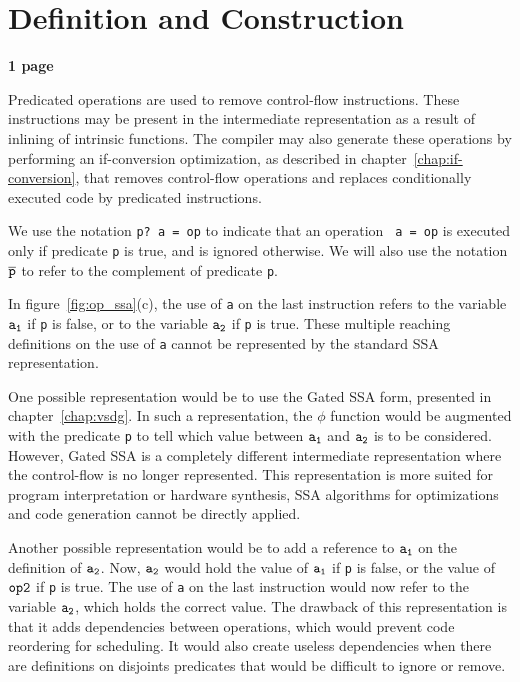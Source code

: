 \section{Definition and Construction}

\textbf{1 page}


Predicated operations are used to remove control-flow instructions.
These instructions may be present in the intermediate representation
as a result of inlining of intrinsic functions. The compiler may also
generate these operations by performing an if-conversion optimization,
as described in chapter~\ref{chap:if-conversion}, that removes
control-flow operations and replaces conditionally executed code by
predicated instructions.

We use the notation {\tt p? a = op} to indicate that an operation {\tt
  a = op} is executed only if predicate {\tt p} is true, and is
ignored otherwise. We will also use the notation ${\tt \overline{p}}$
to refer to the complement of predicate {\tt p}.

In figure~\ref{fig:op_ssa}(c), the use of {\tt a} on the last
instruction refers to the variable ${\tt a_1}$ if {\tt p} is false, or
to the variable ${\tt a_2}$ if {\tt p} is true. These multiple
reaching definitions on the use of {\tt a} cannot be represented by
the standard SSA representation.

One possible representation would be to use the Gated SSA form,
presented in chapter~\ref{chap:vsdg}. In such a representation, the
$\phi$ function would be augmented with the predicate {\tt p} to tell
which value between ${\tt a_1}$ and ${\tt a_2}$ is to be
considered. However, Gated SSA is a completely different intermediate
representation where the control-flow is no longer represented. This
representation is more suited for program interpretation or hardware
synthesis, SSA algorithms for optimizations and code generation cannot
be directly applied.

Another possible representation would be to add a reference to ${\tt
  a_1}$ on the definition of ${\tt a_2}$. Now, ${\tt a_2}$ would hold
the value of ${\tt a_1}$ if {\tt p} is false, or the value of ${\tt
  op2}$ if {\tt p} is true. The use of {\tt a} on the last instruction
would now refer to the variable ${\tt a_2}$, which holds the correct
value. The drawback of this representation is that it adds
dependencies between operations, which would prevent code reordering
for scheduling. It would also create useless dependencies when there
are definitions on disjoints predicates that would be difficult to
ignore or remove.

